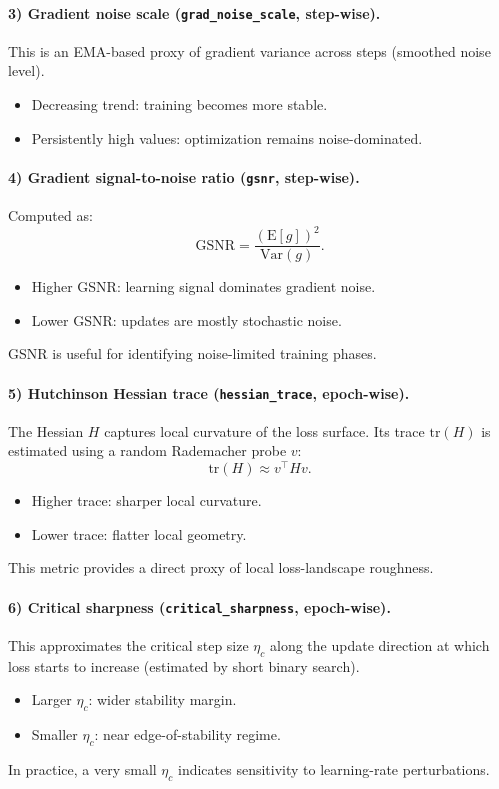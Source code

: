 \paragraph{3) Gradient noise scale (\texttt{grad\_noise\_scale}, step-wise).}
This is an EMA-based proxy of gradient variance across steps (smoothed noise level).
\begin{itemize}
    \item Decreasing trend: training becomes more stable.
    \item Persistently high values: optimization remains noise-dominated.
\end{itemize}

\paragraph{4) Gradient signal-to-noise ratio (\texttt{gsnr}, step-wise).}
Computed as:
\[
\mathrm{GSNR} = \frac{(\mathrm{E}[g])^2}{\mathrm{Var}(g)}.
\]
\begin{itemize}
    \item Higher GSNR: learning signal dominates gradient noise.
    \item Lower GSNR: updates are mostly stochastic noise.
\end{itemize}
GSNR is useful for identifying noise-limited training phases.

\paragraph{5) Hutchinson Hessian trace (\texttt{hessian\_trace}, epoch-wise).}
The Hessian \(H\) captures local curvature of the loss surface. Its trace
\(\mathrm{tr}(H)\) is estimated using a random Rademacher probe \(v\):
\[
\mathrm{tr}(H) \approx v^\top H v.
\]
\begin{itemize}
    \item Higher trace: sharper local curvature.
    \item Lower trace: flatter local geometry.
\end{itemize}
This metric provides a direct proxy of local loss-landscape roughness.

\paragraph{6) Critical sharpness (\texttt{critical\_sharpness}, epoch-wise).}
This approximates the critical step size \(\eta_c\) along the update direction
at which loss starts to increase (estimated by short binary search).
\begin{itemize}
    \item Larger \(\eta_c\): wider stability margin.
    \item Smaller \(\eta_c\): near edge-of-stability regime.
\end{itemize}
In practice, a very small \(\eta_c\) indicates sensitivity to learning-rate
perturbations.


